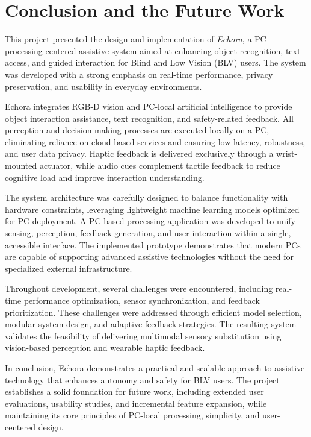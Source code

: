 \chapter{Conclusion and the Future Work}

This project presented the design and implementation of \textit{Echora}, a PC-processing-centered assistive system aimed at enhancing object recognition, text access, and guided interaction for Blind and Low Vision (BLV) users. The system was developed with a strong emphasis on real-time performance, privacy preservation, and usability in everyday environments.

Echora integrates RGB-D vision and PC-local artificial intelligence to provide object interaction assistance, text recognition, and safety-related feedback. All perception and decision-making processes are executed locally on a PC, eliminating reliance on cloud-based services and ensuring low latency, robustness, and user data privacy. Haptic feedback is delivered exclusively through a wrist-mounted actuator, while audio cues complement tactile feedback to reduce cognitive load and improve interaction understanding.

The system architecture was carefully designed to balance functionality with hardware constraints, leveraging lightweight machine learning models optimized for PC deployment. A PC-based processing application was developed to unify sensing, perception, feedback generation, and user interaction within a single, accessible interface. The implemented prototype demonstrates that modern PCs are capable of supporting advanced assistive technologies without the need for specialized external infrastructure.

Throughout development, several challenges were encountered, including real-time performance optimization, sensor synchronization, and feedback prioritization. These challenges were addressed through efficient model selection, modular system design, and adaptive feedback strategies. The resulting system validates the feasibility of delivering multimodal sensory substitution using vision-based perception and wearable haptic feedback.

In conclusion, Echora demonstrates a practical and scalable approach to assistive technology that enhances autonomy and safety for BLV users. The project establishes a solid foundation for future work, including extended user evaluations, usability studies, and incremental feature expansion, while maintaining its core principles of PC-local processing, simplicity, and user-centered design.

